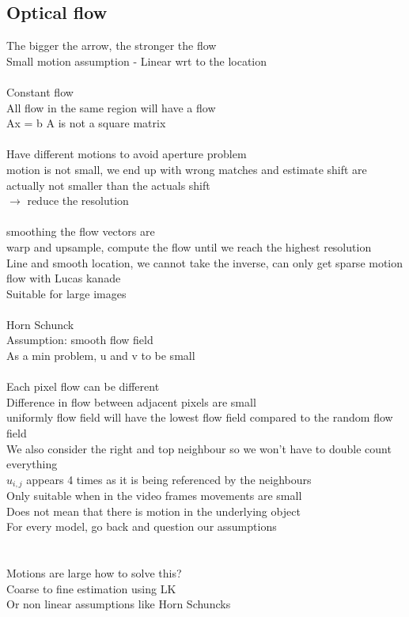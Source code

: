 \documentclass[11pt]{article}
\begin{document}
\subsection*{Optical flow}
The bigger the arrow, the stronger the flow
\\
Small motion assumption - Linear wrt to the location
\\\\
Constant flow\\
All flow in the same region will have a flow
\\
Ax = b A is not a square matrix
\\\\
Have different motions to avoid aperture problem\\
motion is not small, we end up with wrong matches and estimate shift are actually not smaller than the actuals shift
\\
$\rightarrow$ reduce the resolution
\\
\\
smoothing the flow vectors are 
\\
warp and upsample,
compute the flow until we reach the highest resolution
\\
Line and smooth location, we cannot take the inverse, can only get sparse motion flow with Lucas kanade
\\Suitable for large images
\\\\
Horn Schunck\\
Assumption: smooth flow field\\
As a min problem, u and v to be small \\
\\
Each pixel flow can be different
\\
Difference in flow between adjacent pixels are small
\\
uniformly flow field will have the lowest flow field compared to the random flow field
\\
We also consider the right and top neighbour so we won't have to double count everything
\\
$u_{i, j}$ appears 4 times as it is being referenced by the neighbours
\\
Only suitable when in the video frames movements are small
\\
Does not mean that there is motion in the underlying object\\
For every model, go back and question our assumptions\\
\\\\
Motions are large how to solve this?\\
Coarse to fine estimation using LK
\\
Or non linear assumptions like Horn Schuncks
\end{document}

